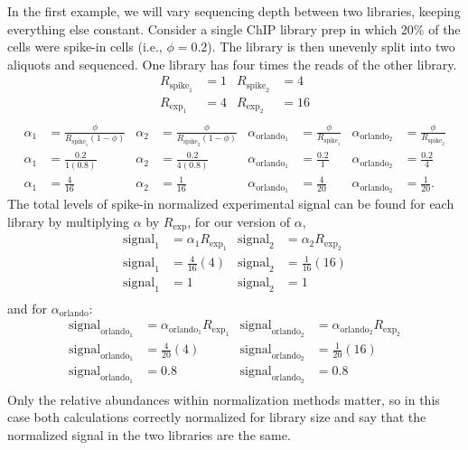 In the first example, we will vary sequencing depth between two libraries, keeping everything else constant.
Consider a single ChIP library prep in which 20\% of the cells were spike-in cells (i.e., $\phi=0.2$).
The library is then unevenly split into two aliquots and sequenced.
One library has four times the reads of the other library.
\begin{align*}
    R_{\text{spike}_1} &= 1 & R_{\text{spike}_2} &= 4 \\
    R_{\text{exp}_1} &= 4 & R_{\text{exp}_2} &= 16 \\
\end{align*}
\begin{align*}
    \alpha_1 &= \frac{\phi}{R_{\text{spike}_1} \left(1-\phi \right)} &
    \alpha_2 &= \frac{\phi}{R_{\text{spike}_2} \left(1-\phi \right)} &
    \alpha_{\text{orlando}_1} &= \frac{\phi}{R_{\text{spike}_1}} &
    \alpha_{\text{orlando}_2} &= \frac{\phi}{R_{\text{spike}_2}} \\
    \alpha_1 &= \frac{0.2}{1 \left(0.8 \right)} &
    \alpha_2 &= \frac{0.2}{4 \left(0.8 \right)} &
    \alpha_{\text{orlando}_1} &= \frac{0.2}{1} &
    \alpha_{\text{orlando}_2} &= \frac{0.2}{4} \\
    \alpha_1 &= \frac{4}{16} &
    \alpha_2 &= \frac{1}{16} &
    \alpha_{\text{orlando}_1} &= \frac{4}{20} &
    \alpha_{\text{orlando}_2} &= \frac{1}{20}.
\end{align*}
The total levels of spike-in normalized experimental signal can be found for each library by multiplying $\alpha$ by $R_\text{exp}$, for our version of $\alpha$,
\begin{align*}
    \text{signal}_1 &= \alpha_1 R_{\text{exp}_1}  &
    \text{signal}_2 &= \alpha_2 R_{\text{exp}_2}  \\
    \text{signal}_1 &=  \frac{4}{16} \left(4 \right)  &
    \text{signal}_2 &=  \frac{1}{16} \left(16 \right)  \\
    \text{signal}_1 &=  1 &
    \text{signal}_2 &=  1 \\
\end{align*}
and for $\alpha_\text{orlando}$:
\begin{align*}
    \text{signal}_{\text{orlando}_1} &= \alpha_{\text{orlando}_1} R_{\text{exp}_1} &
    \text{signal}_{\text{orlando}_2} &= \alpha_{\text{orlando}_2} R_{\text{exp}_2} \\
    \text{signal}_{\text{orlando}_1} &= \frac{4}{20} \left(4\right) &
    \text{signal}_{\text{orlando}_2} &= \frac{1}{20} \left(16\right) \\
    \text{signal}_{\text{orlando}_1} &= 0.8 &
    \text{signal}_{\text{orlando}_2} &= 0.8 \\
\end{align*}
Only the relative abundances within normalization methods matter, so in this case both calculations correctly normalized for library size and say that the normalized signal in the two libraries are the same.

